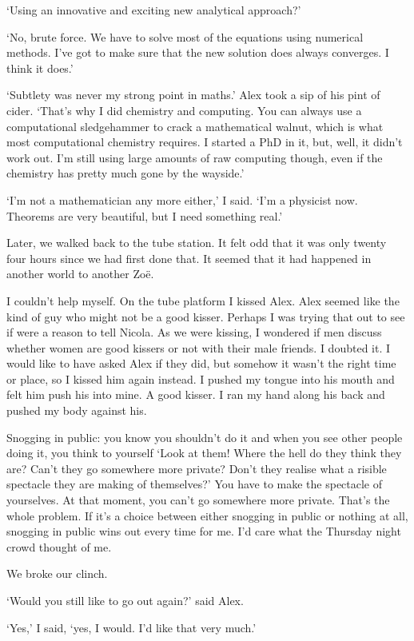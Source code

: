 `Using an innovative and exciting new analytical approach?'

`No, brute force. We have to solve most of the equations using
numerical methods. I've got to make sure that the new solution
does always converges. I think it does.'

`Subtlety was never my strong point in maths.' Alex took a sip of
his pint of cider. `That's why I did chemistry and computing. You
can always use a computational sledgehammer to crack a mathematical
walnut, which is what most computational chemistry requires. I
started a PhD in it, but, well, it didn't work out. I'm still using
large amounts of raw computing though, even if the chemistry has
pretty much gone by the wayside.'

`I'm not a mathematician any more either,' I said. `I'm a physicist now.
Theorems are very beautiful, but I need something real.'

Later, we walked back to the tube station. It felt odd that it was
only twenty four hours since we had first done that. It seemed that
it had happened in another world to another Zoë.

I couldn't help myself. On the tube platform I kissed Alex. Alex seemed like the kind of guy
who might not be a good kisser. Perhaps I was trying that out to see if were a reason to tell Nicola. As we were kissing, I wondered if men discuss whether
women are good kissers or not with their male friends. I doubted it.
I would like to have asked Alex if they did, but somehow it wasn't
the right time or place, so I kissed him again instead. I pushed my
tongue into his mouth and felt him push his into mine. A good
kisser. I ran my hand along his back and pushed my body against his.

Snogging in public: you know you shouldn't do it and when you see
other people doing it, you think to yourself `Look at them! Where
the hell do they think they are? Can't they go somewhere more
private? Don't they realise what a risible spectacle they are making
of themselves?' You have to make the spectacle of yourselves. At
that moment, you can't go somewhere more private. That's the whole
problem. If it's a choice between either snogging in public or
nothing at all, snogging in public wins out every time for me. I'd
care what the Thursday night crowd thought of me.

We broke our clinch.

`Would you still like to go out again?' said Alex.

`Yes,' I said, `yes, I would. I'd like that very much.'
\vfill\eject
